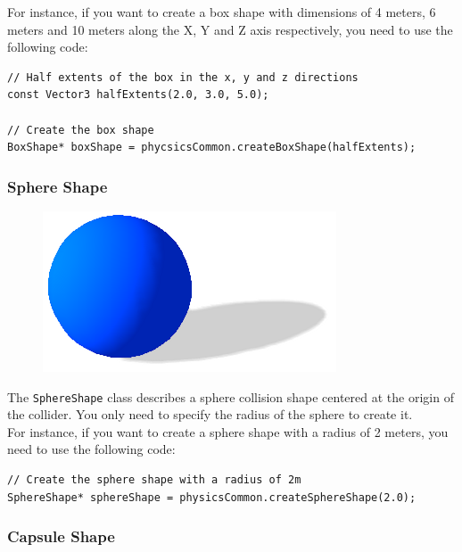 \documentclass[a4paper,12pt]{article}
\begin{document}
    For instance, if you want to create a box shape with dimensions of 4 meters, 6 meters and 10 meters along the X, Y and Z axis respectively, you
    need to use the following code: \\

    \begin{lstlisting}
// Half extents of the box in the x, y and z directions
const Vector3 halfExtents(2.0, 3.0, 5.0);

// Create the box shape
BoxShape* boxShape = phycsicsCommon.createBoxShape(halfExtents);
  \end{lstlisting}

    \vspace{0.6cm}

    \subsubsection{Sphere Shape}

    \begin{figure}[h]
        \centering
        \includegraphics{sphereshape.png}
        \label{fig:sphereshape}
    \end{figure}

    The \texttt{SphereShape} class describes a sphere collision shape centered at the origin of the collider. You only need to specify the
    radius of the sphere to create it. \\

    For instance, if you want to create a sphere shape with a radius of 2 meters, you need to use the following code: \\

    \begin{lstlisting}
// Create the sphere shape with a radius of 2m
SphereShape* sphereShape = physicsCommon.createSphereShape(2.0);
  \end{lstlisting}

    \vspace{0.6cm}

    \subsubsection{Capsule Shape}
\end{document}

